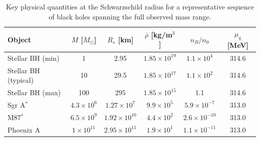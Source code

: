 \begin{table}
\centering
\caption{Key physical quantities at the Schwarzschild radius for a representative sequence of black holes spanning the full observed mass range.}
\label{tab:main_results}
\begin{tabular}{lccccc}
\toprule
Object & $M$ [$M_\odot$] & $R_s$ [km] & $\bar\rho$ [kg/m$^3$] & $n_B/n_0$ & $\mu_q$ [MeV] \\
\midrule
Stellar BH (min) & 1 & 2.95 & $1.85\times10^{19}$ & $1.1\times10^4$ & 314.6 \\
Stellar BH (typical) & 10 & 29.5 & $1.85\times10^{17}$ & $1.1\times10^2$ & 314.6 \\
Stellar BH (max) & 100 & 295 & $1.85\times10^{15}$ & 1.1 & 314.6 \\
Sgr A$^*$ & $4.3\times10^6$ & $1.27\times10^7$ & $9.9\times10^5$ & $5.9\times10^{-7}$ & 313.0 \\
M87$^*$ & $6.5\times10^9$ & $1.92\times10^{10}$ & $4.4\times10^2$ & $2.6\times10^{-10}$ & 313.0 \\
Phoenix A & $1\times10^{11}$ & $2.95\times10^{11}$ & $1.9\times10^1$ & $1.1\times10^{-11}$ & 313.0 \\
\bottomrule
\end{tabular}
\end{table}
